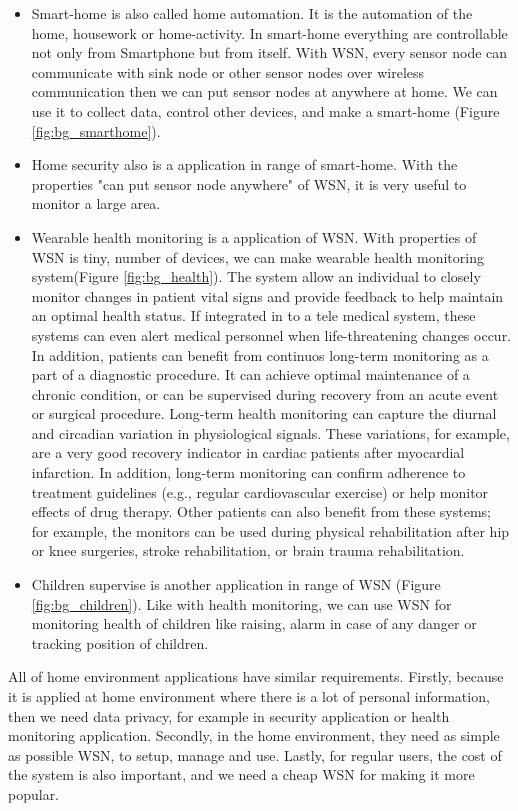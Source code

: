 \begin{itemize}
\item{Smart-home is also called home automation. It is the automation of the home, housework or home-activity. In smart-home everything are controllable not only from Smartphone but from itself. With WSN, every sensor node can communicate with sink node or other sensor nodes over wireless communication then we can put sensor nodes at anywhere at home. We can use it to collect data, control other devices, and make a smart-home (Figure \ref{fig:bg_smarthome}).}
\item{Home security also is a application in range of smart-home. With the properties "can put sensor node anywhere" of WSN, it is very useful to monitor a large area.}
\item{Wearable health monitoring is a application of WSN. With properties of WSN is tiny, number of devices, we can make wearable health monitoring system(Figure \ref{fig:bg_health}). The system allow an individual to closely monitor changes in patient vital signs and provide feedback to help maintain an optimal health status. If integrated in to a tele medical system, these systems can even alert medical personnel when life-threatening changes occur. In addition, patients can benefit from continuos long-term monitoring as a part of a diagnostic procedure. It can achieve optimal maintenance of a chronic condition, or can be supervised during recovery from an acute event or surgical procedure. Long-term health monitoring can capture the diurnal and circadian variation in physiological signals. These variations, for example, are a very good recovery indicator in cardiac patients after myocardial infarction. In addition, long-term monitoring can confirm adherence to treatment guidelines (e.g., regular cardiovascular exercise) or help monitor effects of drug therapy. Other patients can also benefit from these systems; for
example, the monitors can be used during physical rehabilitation after hip or knee surgeries, stroke rehabilitation, or brain trauma rehabilitation.}
\item{Children supervise is another application in range of WSN (Figure \ref{fig:bg_children}). Like with health monitoring, we can use WSN for monitoring health of children like raising, alarm in case of any danger or tracking position of children.}
\end{itemize}

 All of home environment applications have similar requirements. Firstly, because it is applied at home environment where there is a lot of personal information, then we need data privacy, for example in security application or health monitoring application. Secondly, in the home environment, they need as simple as possible WSN, to setup, manage and use. Lastly, for regular users, the cost of the system is also important, and we need a cheap WSN for making it more popular.
 
